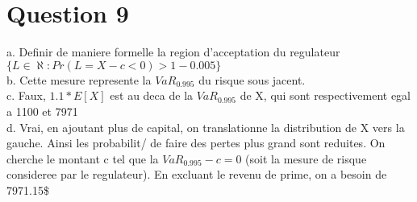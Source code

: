 \section{Question 9}

 a. Definir de maniere formelle la region d'acceptation du regulateur\\
 $\{ L\in \aleph: Pr(L=X-c < 0) > 1 - 0.005 \}$\\
 
 b. Cette mesure represente la $VaR_{0.995}$ du risque sous jacent.\\
 
 c. Faux, $1.1*E[X]$ est au deca de la $VaR_{0.995}$ de X, qui sont respectivement egal a 1100 et 7971\\
 
 d. Vrai, en ajoutant plus de capital, on translationne la distribution de X vers la gauche. Ainsi les probabilit/ de faire des pertes plus grand sont reduites. On cherche le montant c tel que la $VaR_0.995-c =0$ (soit la mesure de risque consideree par le regulateur). En excluant le revenu de prime, on a besoin de 7971.15\$